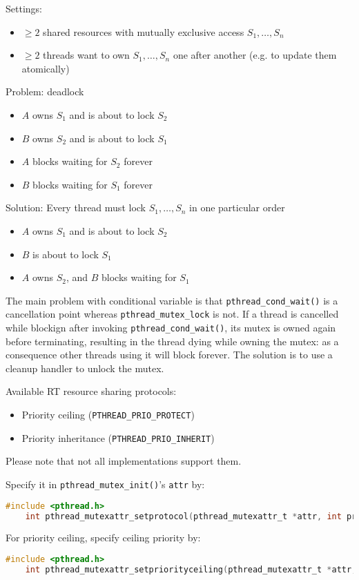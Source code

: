 Settings:
\begin{itemize}
    \item $\ge 2$ shared resources with mutually exclusive access $S_1,\dots, S_n$
    \item $\ge 2$ threads want to own $S_1,\dots, S_n$ one after another (e.g. to update them atomically)
\end{itemize}
Problem: deadlock
\begin{itemize}
    \item $A$ owns $S_1$ and is about to lock $S_2$
    \item $B$ owns $S_2$ and is about to lock $S_1$
    \item $A$ blocks waiting for $S_2$ forever
    \item $B$ blocks waiting for $S_1$ forever
\end{itemize}
Solution: Every thread must lock $S_1, \dots, S_n$ in one particular order
\begin{itemize}
    \item $A$ owns $S_1$ and is about to lock $S_2$
    \item $B$ is about to lock $S_1$
    \item $A$ owns $S_2$, and $B$ blocks waiting for $S_1$
\end{itemize}

The main problem with conditional variable is that \texttt{pthread\_cond\_wait()} is a cancellation point whereas \texttt{pthread\_mutex\_lock} is not.
If a thread is cancelled while blockign after invoking \texttt{pthread\_cond\_wait()}, its mutex is owned again before terminating, resulting in the thread dying while owning the mutex: as a consequence other threads using it will block forever.
The solution is to use a cleanup handler to unlock the mutex.

Available RT resource sharing protocols:
\begin{itemize}
    \item Priority ceiling (\texttt{PTHREAD\_PRIO\_PROTECT})
    \item Priority inheritance (\texttt{PTHREAD\_PRIO\_INHERIT})
\end{itemize}
Please note that not all implementations support them.

Specify it in \texttt{pthread\_mutex\_init()}'s \texttt{attr} by:
\begin{lstlisting}[language=C]
    #include <pthread.h>
    int pthread_mutexattr_setprotocol(pthread_mutexattr_t *attr, int protocol); 
\end{lstlisting}

For priority ceiling, specify ceiling priority by:
\begin{lstlisting}[language=C]
    #include <pthread.h>
    int pthread_mutexattr_setpriorityceiling(pthread_mutexattr_t *attr, int priorityceiling); 
\end{lstlisting}
